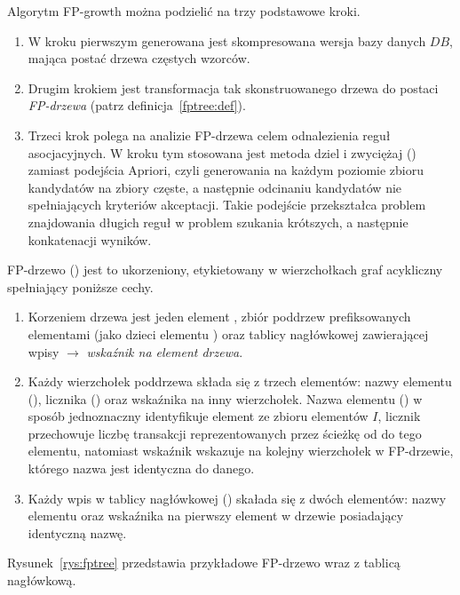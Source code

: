 Algorytm FP-growth można podzielić na trzy podstawowe kroki.
\begin{enumerate}
	\item W kroku pierwszym generowana jest skompresowana wersja bazy danych $DB$, mająca postać drzewa częstych wzorców.
	\item Drugim krokiem jest transformacja tak skonstruowanego drzewa do postaci \emph{FP-drzewa} (patrz definicja~\ref{fptree:def}).
	\item Trzeci krok polega na analizie FP-drzewa celem odnalezienia reguł asocjacyjnych. W kroku tym stosowana jest metoda dziel i zwyciężaj () zamiast podejścia Apriori, czyli generowania na każdym poziomie zbioru kandydatów na zbiory częste, a następnie odcinaniu kandydatów nie spełniających kryteriów akceptacji. Takie podejście przekształca problem znajdowania długich reguł w problem szukania krótszych, a następnie konkatenacji wyników. 
\end{enumerate}

\begin{df}\label{fptree:def}
FP-drzewo () jest to ukorzeniony, etykietowany w wierzchołkach graf acykliczny spełniający poniższe cechy.
\end{df}
\begin{enumerate}
	\item Korzeniem drzewa jest jeden element , zbiór poddrzew prefiksowanych elementami (jako dzieci elementu ) oraz tablicy nagłówkowej zawierającej wpisy  $\rightarrow$ \emph{wskaźnik na element drzewa}.
	\item Każdy wierzchołek poddrzewa składa się z trzech elementów: nazwy elementu (), licznika () oraz wskaźnika na inny wierzchołek. Nazwa elementu () w sposób jednoznaczny identyfikuje element ze zbioru elementów $I$, licznik przechowuje liczbę transakcji reprezentowanych przez ścieżkę od  do tego elementu, natomiast wskaźnik wskazuje na kolejny wierzchołek w FP-drzewie, którego nazwa jest identyczna do danego.
	\item Każdy wpis w tablicy nagłówkowej () skałada się z dwóch elementów: nazwy elementu oraz wskaźnika na pierwszy element w drzewie posiadający identyczną nazwę.
\end{enumerate}

Rysunek~\ref{rys:fptree} przedstawia przykładowe FP-drzewo wraz z tablicą nagłówkową.

